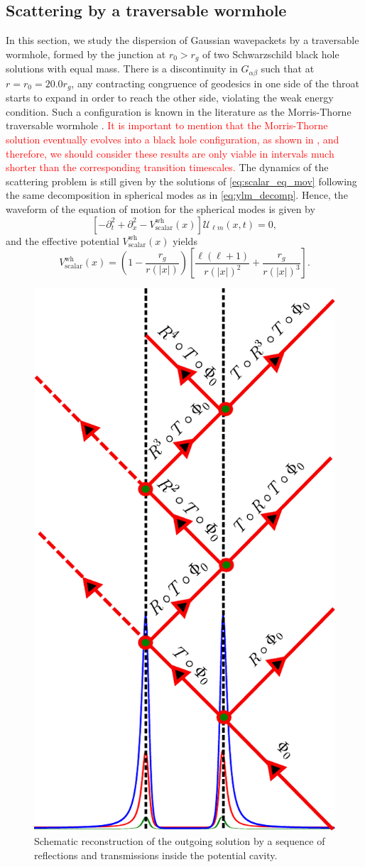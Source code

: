 \documentclass[article,aps,nofootinbib,twocolumn,superscriptaddress]{revtex4-1}
\begin{document}
\subsection{Scattering by a traversable wormhole}\label{subsec:wh} 
In this section, we study the dispersion of Gaussian wavepackets by a traversable wormhole, formed by the junction at $r_0>r_g$ of two Schwarzschild black hole solutions with equal mass. There is a discontinuity in $G_{\alpha\beta}$ such that at $r=r_0=20.0r_g$, any contracting congruence of geodesics in one side of the throat starts to expand in order to reach the other side, violating the weak energy condition. Such a configuration is known in the literature as the Morris-Thorne traversable wormhole \citep{doi:10.1119/1.15620}. \textcolor{red}{It is important to mention that the Morris-Thorne solution eventually evolves into a black hole configuration, as shown in \citep{Wang:2018mlp}, and therefore, we should consider these results are only viable in intervals much shorter than the corresponding transition timescales.} The dynamics of the scattering problem is still given by the solutions of \eqref{eq:scalar_eq_mov} following the same decomposition in spherical modes as in \eqref{eq:ylm_decomp}. Hence, the waveform of the equation of motion for the spherical modes is given by
\begin{equation}
\left[-\partial_t^2+\partial_x^2-V^{\mathrm{wh}}_{\mathrm{scalar}}(x)\right]\mathcal{U}_{\ell m}(x,t) = 0,
\label{eq:wave_scalar_wh}
\end{equation}
and the effective potential $V^{\mathrm{wh}}_{\mathrm{scalar}}(x)$ yields
\begin{equation}
V^{\mathrm{wh}}_{\mathrm{scalar}}\left(x\right) = \left(1-\frac{r_g}{r\left(|x|\right)}\right)\left[\frac{\ell(\ell+1)}{r\left(|x|\right)^2}+\frac{r_g}{r\left(|x|\right)^3}\right].
\end{equation}   
\begin{figure}[t!]
\centering
\includegraphics[width=.3\textwidth]{figures/Geom_optics.pdf}
\caption{\label{fig:Geom_optics} Schematic reconstruction of the outgoing solution by a sequence of reflections and transmissions inside the potential cavity.}
\end{figure}
\end{document}
